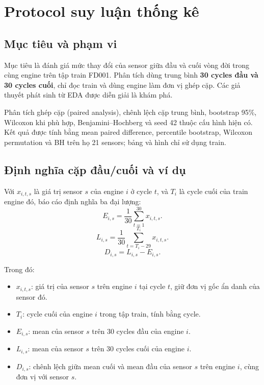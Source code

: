 \section{Protocol suy luận thống kê}
\label{sec:stat-protocol}
\subsection{Mục tiêu và phạm vi}
Mục tiêu là đánh giá mức thay đổi của sensor giữa đầu và cuối vòng đời trong cùng engine trên tập train FD001. Phân tích dùng trung bình \textbf{30 cycles đầu và 30 cycles cuối}, chỉ đọc train và dùng engine làm đơn vị ghép cặp. Các giả thuyết phát sinh từ EDA được diễn giải là khám phá.

Phân tích ghép cặp (paired analysis), chênh lệch cặp trung bình, bootstrap 95\%, Wilcoxon khi phù hợp, Benjamini--Hochberg và seed 42 thuộc cấu hình hiện có. Kết quả được tính bằng mean paired difference, percentile bootstrap, Wilcoxon permutation và BH trên họ 21 sensors; bảng và hình chỉ sử dụng train.

\subsection{Định nghĩa cặp đầu/cuối và ví dụ}
Với $x_{i,t,s}$ là giá trị sensor $s$ của engine $i$ ở cycle $t$, và $T_i$ là
cycle cuối của train engine đó, báo cáo định nghĩa ba đại lượng:
\begin{equation}
 E_{i,s}=\frac{1}{30}\sum_{t=1}^{30}x_{i,t,s}.
 \label{eq:early-mean}
\end{equation}
\begin{equation}
 L_{i,s}=\frac{1}{30}\sum_{t=T_i-29}^{T_i}x_{i,t,s}.
 \label{eq:late-mean}
\end{equation}
\begin{equation}
 D_{i,s}=L_{i,s}-E_{i,s}.
 \label{eq:paired-difference}
\end{equation}

\noindent Trong đó:
\begin{itemize}[label={+},leftmargin=1.6em,itemsep=0.15em,topsep=0.25em]
\item $x_{i,t,s}$: giá trị của sensor $s$ trên engine $i$ tại cycle $t$, giữ
đơn vị gốc ẩn danh của sensor đó.
\item $T_i$: cycle cuối của engine $i$ trong tập train, tính bằng cycle.
\item $E_{i,s}$: mean của sensor $s$ trên 30 cycles đầu của engine $i$.
\item $L_{i,s}$: mean của sensor $s$ trên 30 cycles cuối của engine $i$.
\item $D_{i,s}$: chênh lệch giữa mean cuối và mean đầu của sensor $s$ trên
engine $i$, cùng đơn vị với sensor $s$.
\end{itemize}

